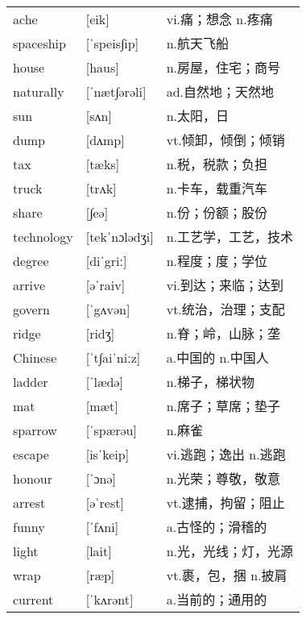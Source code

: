 \documentclass[a4paper]{article}
\begin{document}
\section{}
\begin{tabular}{l l l}

ache & [eik] & vi.痛；想念 n.疼痛 \\
spaceship & [ˈspeis∫ip] & n.航天飞船 \\
house & [haus] & n.房屋，住宅；商号 \\
naturally & [ˈnæt∫ərəli] & ad.自然地；天然地 \\
sun & [sʌn] & n.太阳，日 \\
dump & [dʌmp] & vt.倾卸，倾倒；倾销 \\
tax & [tæks] & n.税，税款；负担 \\
truck & [trʌk] & n.卡车，载重汽车 \\
share & [∫eə] & n.份；份额；股份 \\
technology & [tekˈnɔlədʒi] & n.工艺学，工艺，技术 \\
degree & [diˈgriː] & n.程度；度；学位 \\
arrive & [əˈraiv] & vi.到达；来临；达到 \\
govern & [ˈgʌvən] & vt.统治，治理；支配 \\
ridge & [ridʒ] & n.脊；岭，山脉；垄 \\
Chinese & [ˈt∫aiˈniːz] & a.中国的 n.中国人 \\
ladder & [ˈlædə] & n.梯子，梯状物 \\
mat & [mæt] & n.席子；草席；垫子 \\
sparrow & [ˈspærəu] & n.麻雀 \\
escape & [isˈkeip] & vi.逃跑；逸出 n.逃跑 \\
honour & [ˈɔnə] & n.光荣；尊敬，敬意 \\
arrest & [əˈrest] & vt.逮捕，拘留；阻止 \\
funny & [ˈfʌni] & a.古怪的；滑稽的 \\
light & [lait] & n.光，光线；灯，光源 \\
wrap & [ræp] & vt.裹，包，捆 n.披肩 \\
current & [ˈkʌrənt] & a.当前的；通用的 \\

\end{tabular}
\end{document}
